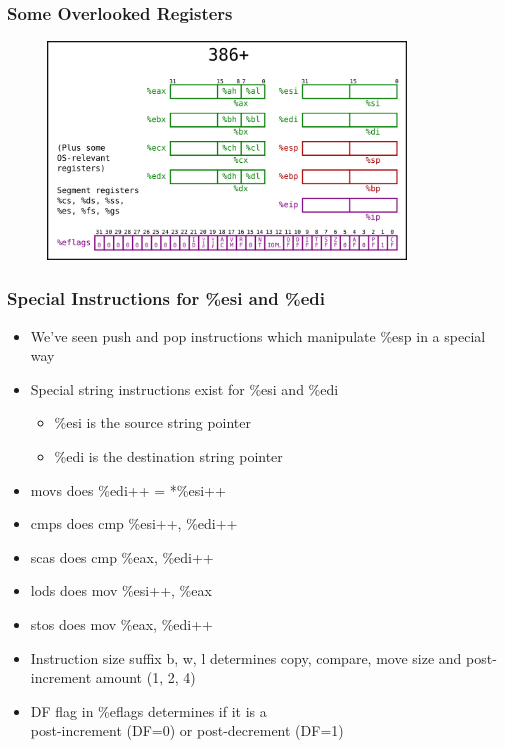 \documentclass[11pt,xcolor=dvipsnames]{beamer}
\newcommand{\vs}{\vspace{0.5em}}
\newcommand{\mvs}{\vspace{-0.95em}}
\begin{document}
\begin{frame}[fragile,t]
\frametitle{Some Overlooked Registers}
\begin{figure}
\centering \includegraphics[width=0.85\textwidth]{figures/386state.png}
\end{figure}
\end{frame}

\begin{frame}[fragile,t]
\mvs
\frametitle{Special Instructions for {\ttfamily \%esi} and {\ttfamily \%edi}}
\begin{itemize}
  \item We've seen {\ttfamily push} and {\ttfamily pop} instructions which manipulate {\ttfamily \%esp} in a special way
  \item Special string instructions exist for {\ttfamily \%esi} and {\ttfamily \%edi}
  \begin{itemize}
    \item {\ttfamily \%esi} is the source string pointer
    \item {\ttfamily \%edi} is the destination string pointer
  \end{itemize}
  \pause
  \item {\ttfamily movs} does {\ttfamily *\%edi++ = *\%esi++}
  \item {\ttfamily cmps} does {\ttfamily cmp \%esi++, \%edi++}
  \item {\ttfamily scas} does {\ttfamily cmp \%eax, \%edi++}
  \item {\ttfamily lods} does {\ttfamily mov \%esi++, \%eax}
  \item {\ttfamily stos} does {\ttfamily mov \%eax, \%edi++}
  \pause
  \vs
  \item Instruction size suffix {\ttfamily b, w, l} determines copy, compare, move size and post-increment amount (1, 2, 4)
  \item DF flag in {\ttfamily \%eflags} determines if it is a \\ post-increment (DF=0) or post-decrement (DF=1)
\end{itemize}
\end{frame}
\end{document}
